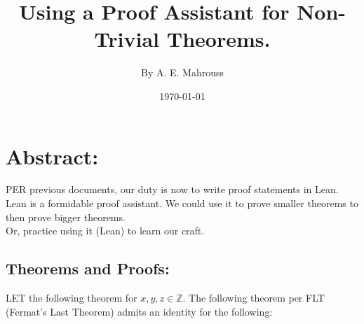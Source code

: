 \documentclass[10pt]{article}
\title{%
	\vspace{-1.5em}%
	\large\textbf{Using a Proof Assistant for Non-Trivial Theorems.}%
}
\author{By A. E. Mahrouss}
\date{\today}
\theoremstyle{plain}
\theoremstyle{definition}
\theoremstyle{remark}
\begin{document}
	
	\maketitle
	\tableofcontents
	\newpage
	
	\section{Abstract:}
	
	\lettrine[lines=2, lhang=0.1, loversize=0.2]{P}ER previous documents, our duty is now to write proof statements in Lean.\\
	Lean is a formidable proof assistant. We could use it to prove smaller theorems to then prove bigger theorems.\\Or, practice using it (Lean) to learn our craft.

	\subsection{Theorems and Proofs:}

	\lettrine[lines=1, lhang=0.1, loversize=0.2]{L}ET the following theorem for $x, y, z \in \mathbb{Z}$. The following theorem per FLT (Fermat's Last Theorem) admits an identity for the following:
	
\end{document}
